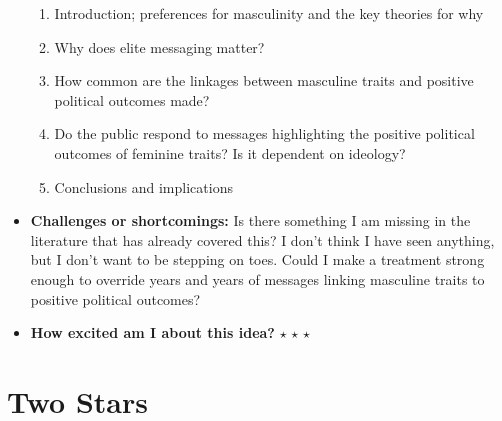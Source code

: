 \documentclass[12pt]{article}
\begin{document}
\begin{itemize}
\begin{enumerate}
            \item Introduction; preferences for masculinity and the key theories for why
            \item Why does elite messaging matter?
            \item How common are the linkages between masculine traits and positive political outcomes made?
            \item Do the public respond to messages highlighting the positive political outcomes of feminine traits? Is it dependent on ideology?
            \item Conclusions and implications
        \end{enumerate}
        \item \textbf{Challenges or shortcomings:} Is there something I am missing in the literature that has already covered this? I don't think I have seen anything, but I don't want to be stepping on toes. Could I make a treatment strong enough to override years and years of messages linking masculine traits to positive political outcomes?
        \item \textbf{How excited am I about this idea?} $\star$ $\star$ $\star$
    \end{itemize}

\section{Two Stars}
\end{document}
